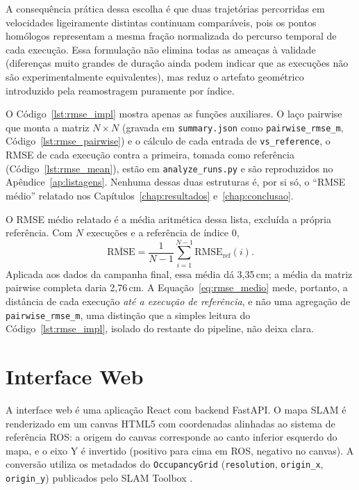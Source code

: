 A consequência prática dessa escolha é que duas trajetórias percorridas em
velocidades ligeiramente distintas continuam comparáveis, pois os pontos
homólogos representam a mesma fração normalizada do percurso temporal de cada
execução. Essa formulação não elimina todas as ameaças à validade (diferenças
muito grandes de duração ainda podem indicar que as execuções não são
experimentalmente equivalentes), mas reduz o artefato geométrico introduzido
pela reamostragem puramente por índice.

O Código~\ref{lst:rmse_impl} mostra apenas as funções auxiliares. O laço
pairwise que monta a matriz $N\times N$ (gravada em \texttt{summary.json} como
\texttt{pairwise\_\allowbreak rmse\_\allowbreak m}, Código~\ref{lst:rmse_pairwise}) e o
cálculo de cada entrada de \texttt{vs\_\allowbreak reference}, o RMSE de cada
execução contra a primeira, tomada como referência
(Código~\ref{lst:rmse_mean}), estão em \texttt{analyze\_\allowbreak runs.py} e são
reproduzidos no Apêndice~\ref{ap:listagens}. Nenhuma dessas duas estruturas é,
por si só, o ``RMSE médio'' relatado nos Capítulos~\ref{chap:resultados}
e~\ref{chap:conclusao}.

O RMSE médio relatado é a média aritmética dessa lista, excluída a própria
referência. Com $N$ execuções e a referência de índice $0$,
\begin{equation}
  \overline{\mathrm{RMSE}} = \frac{1}{N-1}\sum_{i=1}^{N-1} \mathrm{RMSE}_{\mathrm{ref}}(i).
  \label{eq:rmse_medio}
\end{equation}
Aplicada aos dados da campanha final, essa média dá 3,35\,cm; a média da
matriz pairwise completa daria 2,76\,cm. A Equação~\ref{eq:rmse_medio}
mede, portanto, a distância de cada execução \textit{até a execução de
referência}, e não uma agregação de \texttt{pairwise\_\allowbreak rmse\_\allowbreak m},
uma distinção que a simples leitura do
Código~\ref{lst:rmse_impl}, isolado do restante do pipeline, não deixa clara.

\section{Interface Web}
\label{sec:impl_web}

A interface web é uma aplicação React com backend FastAPI. O mapa SLAM é renderizado
em um canvas HTML5 com coordenadas alinhadas ao sistema de referência ROS: a origem
do canvas corresponde ao canto inferior esquerdo do mapa, e o eixo Y é invertido
(positivo para cima em ROS, negativo no canvas). A conversão utiliza os metadados
do \texttt{OccupancyGrid} \cite{elfes1989} (\texttt{resolution}, \texttt{origin\_\allowbreak x}, \texttt{origin\_\allowbreak y})
publicados pelo SLAM Toolbox \cite{macenski2021slam}.

